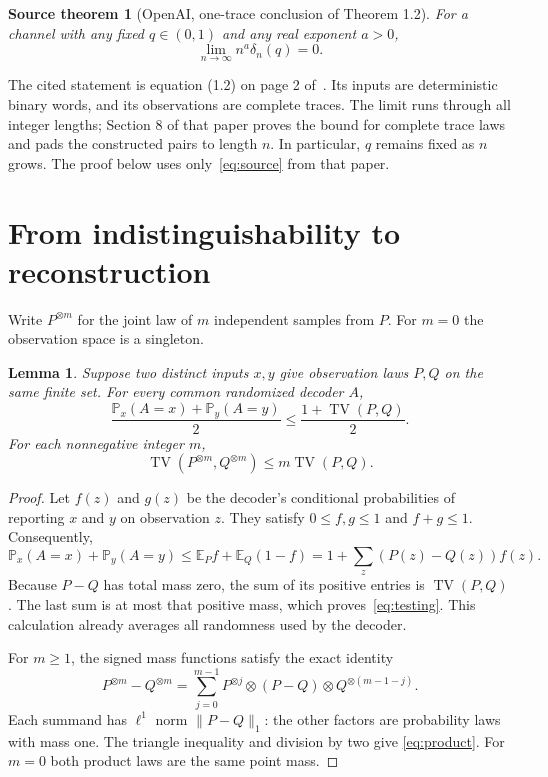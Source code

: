 \documentclass[11pt]{article}
\newtheorem{lemma}{Lemma}
\newtheorem*{sourcetheorem}{Source theorem}
\newcommand{\TV}{\operatorname{TV}}
\newcommand{\Prob}{\mathbb P}
\begin{document}
\begin{sourcetheorem}[OpenAI, one-trace conclusion of Theorem 1.2]
For a channel with any fixed $q\in(0,1)$ and any real exponent $a>0$,
\begin{equation}\label{eq:source}
 \lim_{n\to\infty} n^a\delta_n(q)=0.
\end{equation}
\end{sourcetheorem}

The cited statement is equation (1.2) on page 2
of~\cite{OpenAI2026}. Its inputs are deterministic binary words, and its
observations are complete traces. The limit runs through all integer
lengths; Section 8 of that paper proves the bound for complete trace laws and pads the
constructed pairs to length $n$. In particular, $q$ remains fixed as $n$
grows. The proof below uses only~\eqref{eq:source} from that paper.

\section{From indistinguishability to reconstruction}

Write $P^{\otimes m}$ for the joint law of $m$ independent samples from $P$.
For $m=0$ the observation space is a singleton.

\begin{lemma}\label{lem:testing}
Suppose two distinct inputs $x,y$ give observation laws $P,Q$ on the same
finite set. For every common randomized decoder $A$,
\begin{equation}\label{eq:testing}
 \frac{\Prob_x(A=x)+\Prob_y(A=y)}2
 \le \frac{1+\TV(P,Q)}2.
\end{equation}
For each nonnegative integer $m$,
\begin{equation}\label{eq:product}
 \TV(P^{\otimes m},Q^{\otimes m})\le m\TV(P,Q).
\end{equation}
\end{lemma}

\begin{proof}
Let $f(z)$ and $g(z)$ be the decoder's conditional probabilities of reporting
$x$ and $y$ on observation $z$. They satisfy $0\le f,g\le1$ and $f+g\le1$.
Consequently,
\[
 \Prob_x(A=x)+\Prob_y(A=y)
 \le \mathbb E_P f+\mathbb E_Q(1-f)
 =1+\sum_z(P(z)-Q(z))f(z).
\]
Because $P-Q$ has total mass zero, the sum of its positive entries is
$\TV(P,Q)$. The last sum is at most that positive mass, which
proves~\eqref{eq:testing}. This calculation already averages all randomness
used by the decoder.

For $m\ge1$, the signed mass functions satisfy the exact identity
\[
 P^{\otimes m}-Q^{\otimes m}
 =\sum_{j=0}^{m-1}
 P^{\otimes j}\otimes(P-Q)\otimes Q^{\otimes(m-1-j)}.
\]
Each summand has $\ell^1$ norm $\|P-Q\|_1$: the other factors are probability
laws with mass one. The triangle inequality and division by two give
\eqref{eq:product}. For $m=0$ both product laws are the same point mass.
\end{proof}
\end{document}
